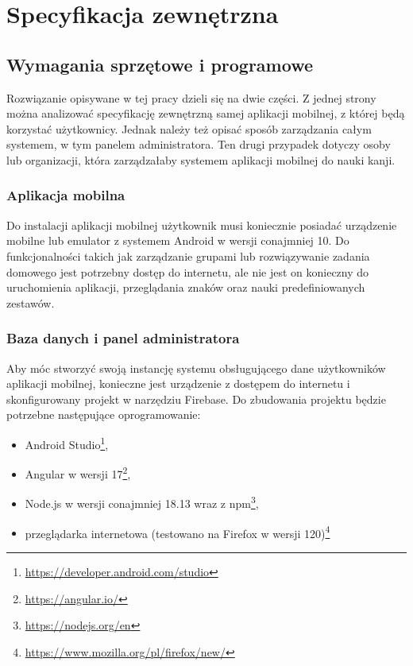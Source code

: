 \documentclass[a4paper,twoside,12pt]{book}
\begin{document}
\chapter{Specyfikacja zewnętrzna}
\label{ch:04}

\section{Wymagania sprzętowe i programowe}
Rozwiązanie opisywane w tej pracy dzieli się na dwie części. Z jednej strony można analizować specyfikację zewnętrzną samej aplikacji mobilnej, z której będą korzystać użytkownicy. Jednak należy też opisać sposób zarządzania całym systemem, w tym panelem administratora. Ten drugi przypadek dotyczy osoby lub organizacji, która zarządzałaby systemem aplikacji mobilnej do nauki kanji.

\subsection{Aplikacja mobilna}

Do instalacji aplikacji mobilnej użytkownik musi koniecznie posiadać urządzenie mobilne lub emulator z systemem Android w wersji conajmniej 10. Do funkcjonalności takich jak zarządzanie grupami lub rozwiązywanie zadania domowego jest potrzebny dostęp do internetu, ale nie jest on konieczny do uruchomienia aplikacji, przeglądania znaków oraz nauki predefiniowanych zestawów. 

\subsection{Baza danych i panel administratora}

Aby móc stworzyć swoją instancję systemu obsługującego dane użytkowników aplikacji mobilnej, konieczne jest urządzenie z dostępem do internetu i skonfigurowany projekt w narzędziu Firebase. Do zbudowania projektu będzie potrzebne następujące oprogramowanie:
\begin{itemize}
\item Android Studio\footnote{\url{https://developer.android.com/studio}},
\item Angular w wersji 17\footnote{\url{https://angular.io/}},
\item Node.js w wersji conajmniej 18.13 wraz z npm\footnote{\url{https://nodejs.org/en}},
\item przeglądarka internetowa (testowano na Firefox w wersji 120)\footnote{\url{https://www.mozilla.org/pl/firefox/new/}}
\end{itemize}
\end{document}
